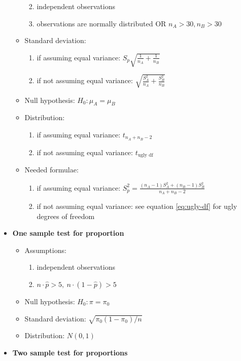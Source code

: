\documentclass[]{book}
\providecommand{\tightlist}{%
  \setlength{\itemsep}{0pt}\setlength{\parskip}{0pt}}
\theoremstyle{definition}
\theoremstyle{definition}
\theoremstyle{definition}
\theoremstyle{remark}
\begin{document}
\begin{itemize}
\begin{itemize}
    \begin{enumerate}
    \def\labelenumi{\roman{enumi}.}
    \tightlist
    \item
      independent observations
    \item
      observations are normally distributed OR \(n_A>30, n_B>30\)
    \end{enumerate}
  \item
    Standard deviation:

    \begin{enumerate}
    \def\labelenumi{\roman{enumi}.}
    \tightlist
    \item
      if assuming equal variance: \(S_p\sqrt{\frac{1}{n_A} + \frac{1}{n_B}}\)
    \item
      if not assuming equal variance: \(\sqrt{\frac{S_A^2}{n_A} + \frac{S_B^2}{n_B}}\)
    \end{enumerate}
  \item
    Null hypothesis: \(H_0: \mu_A = \mu_B\)
  \item
    Distribution:

    \begin{enumerate}
    \def\labelenumi{\roman{enumi}.}
    \tightlist
    \item
      if assuming equal variance: \(t_{n_A + n_B - 2}\)
    \item
      if not assuming equal variance: \(t_{\text{ugly df}}\)
    \end{enumerate}
  \item
    Needed formulae:

    \begin{enumerate}
    \def\labelenumi{\roman{enumi}.}
    \tightlist
    \item
      if assuming equal variance: \(S_p^2 = \frac{(n_A - 1)S_A^2 + (n_B - 1)S_B^2}{n_A + n_B - 2}\)
    \item
      if not assuming equal variance: see equation \eqref{eq:ugly-df} for ugly degrees of freedom
    \end{enumerate}
  \end{itemize}
\item
  \textbf{One sample test for proportion}

  \begin{itemize}
  \tightlist
  \item
    Assumptions:

    \begin{enumerate}
    \def\labelenumi{\roman{enumi}.}
    \tightlist
    \item
      independent observations
    \item
      \(n\cdot \hat{p} > 5,\ n\cdot(1-\hat{p}) > 5\)
    \end{enumerate}
  \item
    Null hypothesis: \(H_0: \pi = \pi_0\)
  \item
    Standard deviation: \(\sqrt{\pi_0(1-\pi_0)/n}\)
  \item
    Distribution: \(N(0,1)\)
  \end{itemize}
\item
  \textbf{Two sample test for proportions}


\end{itemize}
\end{document}
